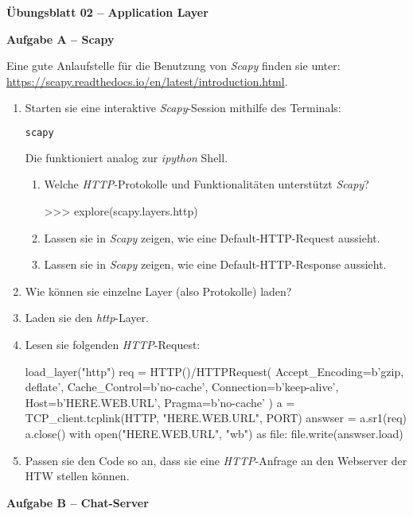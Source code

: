 \documentclass[paper=a4,fontsize=11pt]{scrartcl}%
\numberwithin{equation}{section}
\begin{document}
\begin{center}
\Large{\textbf{Übungsblatt 02 --  Application Layer}}
\end{center}

\begin{center}\Large{\textbf{Aufgabe A -- Scapy}}\end{center}\vskip0.25in
Eine gute Anlaufstelle für die Benutzung von \emph{Scapy} finden sie unter: \url{https://scapy.readthedocs.io/en/latest/introduction.html}.
\begin{enumerate}
	\item Starten sie eine interaktive \emph{Scapy}-Session mithilfe des Terminals:
	\begin{lstlisting}[style=Bash, language=Bash]
scapy
	\end{lstlisting}
	Die funktioniert analog zur \emph{ipython} Shell.
	\begin{enumerate}
		\item Welche \emph{HTTP}-Protokolle und Funktionalitäten unterstützt \emph{Scapy}?
		\begin{python}
>>> explore(scapy.layers.http)
\end{python}
		\item Lassen sie in \emph{Scapy} zeigen, wie eine Default-HTTP-Request aussieht.
		\item Lassen sie in \emph{Scapy} zeigen, wie eine Default-HTTP-Response aussieht.
	\end{enumerate}		
	\item Wie können sie einzelne Layer (also Protokolle) laden?
	\item Laden sie den \emph{http}-Layer.
	\item Lesen sie folgenden \emph{HTTP}-Request:
	\begin{python}
load_layer("http")
req = HTTP()/HTTPRequest(
    Accept_Encoding=b'gzip, deflate',
    Cache_Control=b'no-cache',
    Connection=b'keep-alive',
    Host=b'HERE.WEB.URL',
    Pragma=b'no-cache'
)
a = TCP_client.tcplink(HTTP, "HERE.WEB.URL", PORT)
answser = a.sr1(req)
a.close()
with open("HERE.WEB.URL", "wb") as file:
    file.write(answser.load)
\end{python}
	\item Passen sie den Code so an, dass sie eine \emph{HTTP}-Anfrage an den Webserver der HTW stellen können.
\end{enumerate}

\begin{center}\Large{\textbf{Aufgabe B -- Chat-Server}}\end{center}\vskip0.25in
\end{document}
